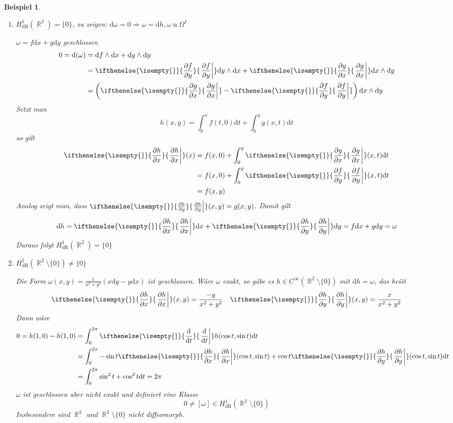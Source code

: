 \documentclass[paper=A4, twoside, chapterprefix=true, bibliography=totoc, headsepline]{scrbook}
\DeclareMathOperator{\R}{\mathbb{R}}
\DeclareMathOperator{\dR}{dR}       %
\DeclareMathOperator{\n}{n}         %
\newcommand{\dop}{\mathrm{d}}
\newcommand{\difffrac}[3][]{\ifthenelse{\isempty{#1}}{\frac{\dop #2}{\dop #3}}{\left. \frac{\dop #2}{\dop #3} \right|_{#1}}}
\newcommand{\pdifffrac}[3][]{\ifthenelse{\isempty{#1}}{\frac{\partial #2}{\partial #3}}{\left. \frac{\partial #2}{\partial #3} \right|_{#1}}}
\theoremstyle{plain}
\theoremstyle{nonumberplain}
\newtheorem{bsp}{Beispiel}
\theoremstyle{empty}
\theoremstyle{break}
\begin{document}
\begin{bsp}
  \begin{enumerate}[label=(\arabic*),leftmargin=*]
  \item $H_{\dR}^1(\R^2) = \{0\}$, \emph{zu zeigen:} $\dop \omega = 0 \Rightarrow \omega = \dop h, \omega \n \Omega^1$
    
    $\omega = f \dop x + g \dop y$ geschlossen
    \begin{align*}
      0 = \dop (\omega) &= \dop f \wedge \dop x + \dop g \wedge \dop y\\
      &= \pdifffrac{f}{y} \dop y \wedge \dop x + \pdifffrac{g}{x} \dop x \wedge \dop y\\
      &= \left( \pdifffrac{g}{x} - \pdifffrac{f}{y} \right) \dop x \wedge \dop y
    \end{align*}
    Setzt man
    \[ h(x,y) = \int_0^{x} f(t,0) \dop t + \int_0^{y} g(x,t) \dop t \]
    so gilt
    \begin{align*}
      \pdifffrac{h}{x}(x) &= f(x,0) + \int_0^{y} \pdifffrac{g}{x}(x,t) \dop t\\
      &= f(x,0) + \int_0^{y} \pdifffrac{f}{y} (x,t) \dop t\\
      &= f(x,y)
    \end{align*}
    Analog zeigt man, dass $\pdifffrac{h}{y}(x,y) = g(x,y)$. Damit gilt
    \[ \dop h = \pdifffrac{h}{x} \dop x + \pdifffrac{h}{y} \dop y = f \dop x + g \dop y = \omega \]
    Daraus folgt $H_{\dR}^1(\R^2) = \{0\}$
  \item $H_{\dR}^1(\R^2 \setminus \{0\}) \ne \{0\}$
    
    Die Form $\omega(x,y) = \frac{1}{x^2+y^2} (x \dop y - y \dop x)$ ist geschlossen. W\"are $\omega$ exakt, so g\"abe es $h \in C^{\infty}(\R^2 \setminus \{0\})$ mit $\dop h = \omega$, das hei\"st
    \begin{align*}
	    	\pdifffrac{h}{x}(x,y) = \frac{-y}{x^2+y^2} && \pdifffrac{h}{y}(x,y) = \frac{x}{x^2+y^2}
	\end{align*}
    Dann w\"are
    \begin{align*}
      0 = h(1,0) - h(1,0) &= \int_{0}^{2\pi} \difffrac{}{t} h(\cos t, \sin t) \dop t\\
      &= \int_{0}^{2\pi} - \sin t \pdifffrac{h}{x} (\cos t, \sin t) + \cos t \pdifffrac{h}{y} (\cos t, \sin t) \dop t\\
      &= \int_{0}^{2\pi} \sin^2 t + \cos^2 t \dop t = 2 \pi
    \end{align*}
    $\omega$ ist geschlossen aber \emph{nicht} exakt und definiert eine Klasse
    \[ 0 \ne [\omega] \in H_{\dR}^1(\R^2 \setminus \{0\}) \]
    Insbesondere sind $\R^2$ und $\R^2 \setminus \{0\}$ \emph{nicht} diffeomorph.
  \end{enumerate}
\end{bsp}
\end{document}
